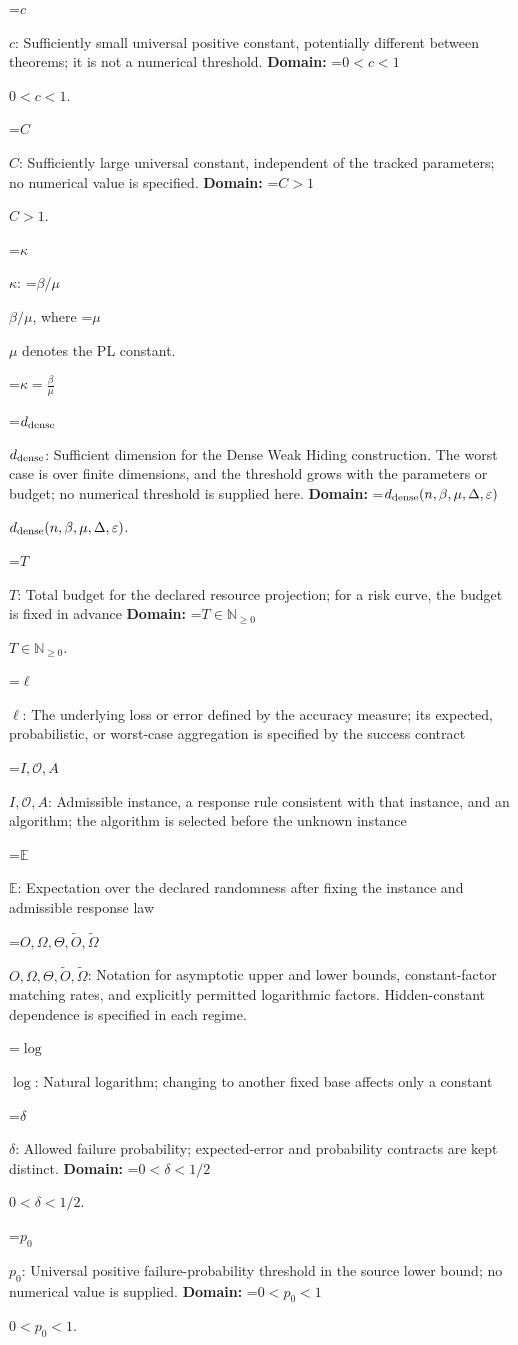 \documentclass[10pt,a4paper]{article}
\newcommand{\AtlasMath}[1]{\par\begingroup\centering\setbox0=\hbox{$\displaystyle #1$}\ifdim\wd0>1.4\linewidth\typeout{ATLAS WIDE FORMULA: \the\wd0}\fi\ifdim\wd0>\linewidth\resizebox{\linewidth}{!}{\box0}\else\box0\fi\par\endgroup}
\newcommand{\AtlasInlineMath}[1]{\begingroup\setbox0=\hbox{$#1$}\ifdim\wd0>.4\linewidth\endgroup\AtlasMath{#1}\else\endgroup$#1$\fi}
\begin{document}
\AtlasInlineMath{c}: Sufficiently small universal positive constant, potentially different between theorems; it is not a numerical threshold. \textbf{Domain:} \AtlasInlineMath{0<c<1}.

\AtlasInlineMath{C}: Sufficiently large universal constant, independent of the tracked parameters; no numerical value is specified. \textbf{Domain:} \AtlasInlineMath{C>1}.

\AtlasInlineMath{\kappa}: \AtlasInlineMath{\beta/\mu}, where \AtlasInlineMath{\mu} denotes the PL constant.


\AtlasMath{\kappa=\frac{\beta}{\mu}}


\AtlasInlineMath{d_{\rm dense}}: Sufficient dimension for the Dense Weak Hiding construction. The worst case is over finite dimensions, and the threshold grows with the parameters or budget; no numerical threshold is supplied here. \textbf{Domain:} \AtlasInlineMath{d_{\rm dense}(n,\beta,\mu,\Delta,\varepsilon)}.

\AtlasInlineMath{T}: Total budget for the declared resource projection; for a risk curve, the budget is fixed in advance \textbf{Domain:} \AtlasInlineMath{T\in\mathbb{N}_{\ge0}}.

\AtlasInlineMath{\ell}: The underlying loss or error defined by the accuracy measure; its expected, probabilistic, or worst-case aggregation is specified by the success contract

\AtlasInlineMath{I,\mathcal{O},A}: Admissible instance, a response rule consistent with that instance, and an algorithm; the algorithm is selected before the unknown instance

\AtlasInlineMath{\mathbb{E}}: Expectation over the declared randomness after fixing the instance and admissible response law

\AtlasInlineMath{O,\Omega,\Theta,\widetilde{O},\widetilde\Omega}: Notation for asymptotic upper and lower bounds, constant-factor matching rates, and explicitly permitted logarithmic factors. Hidden-constant dependence is specified in each regime.

\AtlasInlineMath{\log}: Natural logarithm; changing to another fixed base affects only a constant

\AtlasInlineMath{\delta}: Allowed failure probability; expected-error and probability contracts are kept distinct. \textbf{Domain:} \AtlasInlineMath{0<\delta<1/2}.

\AtlasInlineMath{p_0}: Universal positive failure-probability threshold in the source lower bound; no numerical value is supplied. \textbf{Domain:} \AtlasInlineMath{0<p_0<1}.
\end{document}
